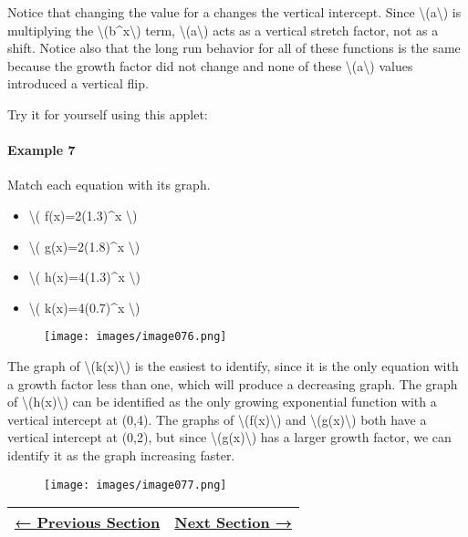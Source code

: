 Notice that changing the value for a changes the vertical intercept.
Since \textbackslash{}(a\textbackslash{}) is multiplying the
\textbackslash{}(b\^{}x\textbackslash{}) term,
\textbackslash{}(a\textbackslash{}) acts as a vertical stretch factor,
not as a shift. Notice also that the long run behavior for all of these
functions is the same because the growth factor did not change and none
of these \textbackslash{}(a\textbackslash{}) values introduced a
vertical flip.

Try it for yourself using this applet:

\hypertarget{applet_container}{}

\hypertarget{example-7}{%
\paragraph{Example 7}\label{example-7}}

Match each equation with its graph.

\begin{itemize}
\tightlist
\item
  \textbackslash{}( f(x)=2(1.3)\^{}x \textbackslash{})
\item
  \textbackslash{}( g(x)=2(1.8)\^{}x \textbackslash{})
\item
  \textbackslash{}( h(x)=4(1.3)\^{}x \textbackslash{})
\item
  \textbackslash{}( k(x)=4(0.7)\^{}x \textbackslash{})
\end{itemize}

\begin{figure}
\centering
\texttt{[image: images/image076.png]}
\caption{}
\end{figure}

The graph of \textbackslash{}(k(x)\textbackslash{}) is the easiest to
identify, since it is the only equation with a growth factor less than
one, which will produce a decreasing graph. The graph of
\textbackslash{}(h(x)\textbackslash{}) can be identified as the only
growing exponential function with a vertical intercept at (0,4). The
graphs of \textbackslash{}(f(x)\textbackslash{}) and
\textbackslash{}(g(x)\textbackslash{}) both have a vertical intercept at
(0,2), but since \textbackslash{}(g(x)\textbackslash{}) has a larger
growth factor, we can identify it as the graph increasing faster.

\begin{figure}
\centering
\texttt{[image: images/image077.png]}
\caption{}
\end{figure}

\begin{longtable}[]{@{}ll@{}}
\toprule
\endhead
\href{section.1-6php}{← Previous Section} & \href{section1-8.php}{Next
Section →}\tabularnewline
\bottomrule
\end{longtable}
